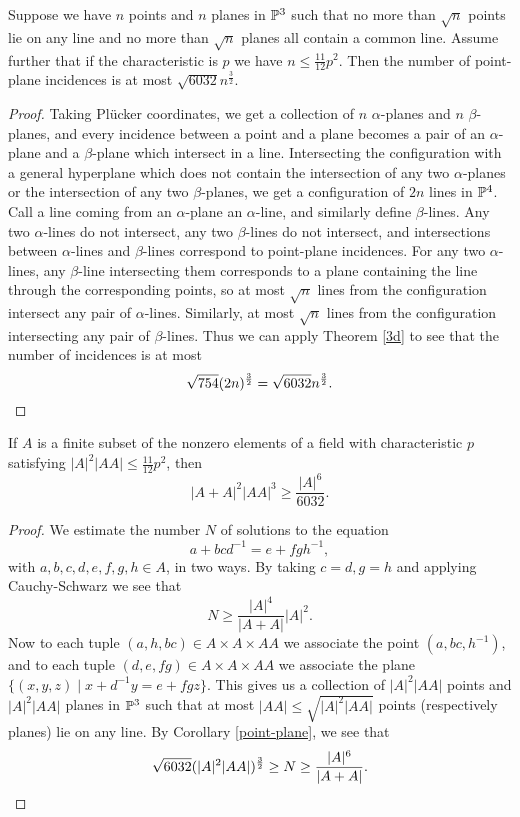 \begin{cor}[Rudnev]\label{point-plane} Suppose we have $n$ points and $n$ planes in $\mathbb{P}^3$ such that no more than $\sqrt{n}$ points lie on any line and no more than $\sqrt{n}$ planes all contain a common line. Assume further that if the characteristic is $p$ we have $n \le \frac{11}{12}p^2$. Then the number of point-plane incidences is at most $\sqrt{6032}n^{\frac{3}{2}}$.
\end{cor}
\begin{proof} Taking Pl\"ucker coordinates, we get a collection of $n$ $\alpha$-planes and $n$ $\beta$-planes, and every incidence between a point and a plane becomes a pair of an $\alpha$-plane and a $\beta$-plane which intersect in a line. Intersecting the configuration with a general hyperplane which does not contain the intersection of any two $\alpha$-planes or the intersection of any two $\beta$-planes, we get a configuration of $2n$ lines in $\mathbb{P}^4$. Call a line coming from an $\alpha$-plane an $\alpha$-line, and similarly define $\beta$-lines. Any two $\alpha$-lines do not intersect, any two $\beta$-lines do not intersect, and intersections between $\alpha$-lines and $\beta$-lines correspond to point-plane incidences. For any two $\alpha$-lines, any $\beta$-line intersecting them corresponds to a plane containing the line through the corresponding points, so at most $\sqrt{n}$ lines from the configuration intersect any pair of $\alpha$-lines. Similarly, at most $\sqrt{n}$ lines from the configuration intersecting any pair of $\beta$-lines. Thus we can apply Theorem \ref{3d} to see that the number of incidences is at most
\[
\sqrt{754}(2n)^{\frac{3}{2}} = \sqrt{6032}n^{\frac{3}{2}}.\qedhere
\]
\end{proof}

\begin{thm} If $A$ is a finite subset of the nonzero elements of a field with characteristic $p$ satisfying $|A|^2|AA| \le \frac{11}{12}p^2$, then
\[
|A+A|^2|AA|^3 \ge \frac{|A|^6}{6032}.
\]
\end{thm}
\begin{proof} We estimate the number $N$ of solutions to the equation
\[
a+bcd^{-1} = e + fgh^{-1},
\]
with $a,b,c,d,e,f,g,h \in A$, in two ways. By taking $c=d, g=h$ and applying Cauchy-Schwarz we see that
\[
N \ge \frac{|A|^4}{|A+A|}|A|^2.
\]
Now to each tuple $(a,h,bc) \in A\times A\times AA$ we associate the point $(a,bc,h^{-1})$, and to each tuple $(d,e,fg) \in A\times A\times AA$ we associate the plane $\{(x,y,z) \mid x+d^{-1}y = e + fgz\}$. This gives us a collection of $|A|^2|AA|$ points and $|A|^2|AA|$ planes in $\mathbb{P}^3$ such that at most $|AA| \le \sqrt{|A|^2|AA|}$ points (respectively planes) lie on any line. By Corollary \ref{point-plane}, we see that
\[
\sqrt{6032}(|A|^2|AA|)^{\frac{3}{2}} \ge N \ge \frac{|A|^6}{|A+A|}.\qedhere
\]
\end{proof}

